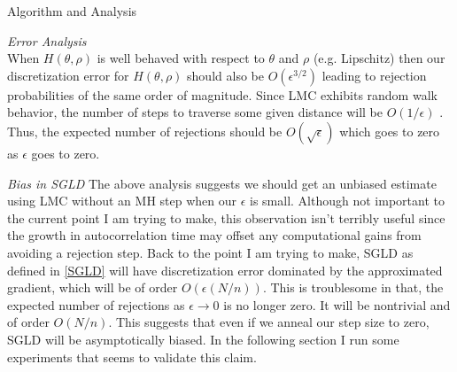 \documentclass{article}
\begin{document}
\begin{section}{Algorithm and Analysis}
\begin{subsection}{\it Error Analysis}
\begin{equation}
\end{equation}
When $H(\theta,\rho)$ is well behaved with respect to $\theta$ and $\rho$ (e.g. Lipschitz) then our discretization error for $H(\theta,\rho)$ should also be $O(\epsilon^{3/2})$ leading to rejection probabilities of the same order of magnitude.  Since LMC exhibits random walk behavior, the number of steps to traverse some given distance will be $O(1/\epsilon)$ \cite{Neal93}.  Thus, the expected number of rejections should be $O(\sqrt{\epsilon})$ which goes to zero as $\epsilon$ goes to zero.
\begin{subsubsection}{\it Bias in SGLD}
The above analysis suggests we should get an unbiased estimate using LMC without an MH step when our $\epsilon$ is small.  Although not important to the current point I am trying to make, this observation isn't terribly useful since the growth in autocorrelation time may offset any computational gains from avoiding a rejection step.  Back to the point I am trying to make, SGLD as defined in \eqref{SGLD} will have discretization error dominated by the approximated gradient, which will be of order $O(\epsilon (N/n))$.  This is troublesome in that, the expected number of rejections as $\epsilon \to 0$ is no longer zero. It will be nontrivial and of order $O(N/n)$.  This suggests that even if we anneal our step size to zero, SGLD will be asymptotically biased.  In the following section I run some experiments that seems to validate this claim.
\end{subsubsection}
\end{subsection}
\end{section}
\end{document}

